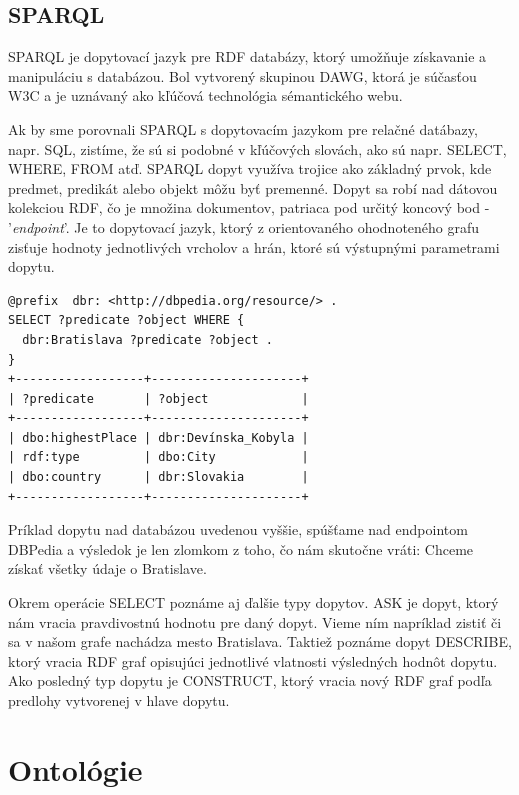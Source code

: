 \documentclass[12pt, a4paper, oneside]{book}
\begin{document}
\section{SPARQL}
SPARQL \cite{sparql} je dopytovací jazyk pre RDF databázy, ktorý umožňuje získavanie a manipuláciu s databázou. Bol vytvorený skupinou DAWG, ktorá je súčasťou W3C a je uznávaný ako kľúčová technológia sémantického webu. 


\quad Ak by sme porovnali SPARQL s dopytovacím jazykom pre relačné datábazy, napr. SQL, zistíme, že sú si podobné v kľúčových slovách, ako sú napr. SELECT, WHERE, FROM atď. SPARQL dopyt využíva trojice ako základný prvok, kde predmet, predikát alebo objekt môžu byť premenné. Dopyt sa robí nad dátovou kolekciou RDF, čo je množina dokumentov, patriaca pod určitý koncový bod - '\textit{endpoint}'. Je to dopytovací jazyk, ktorý z orientovaného ohodnoteného grafu zisťuje hodnoty jednotlivých vrcholov a hrán, ktoré sú výstupnými parametrami dopytu.

\begin{verbatim}
@prefix	 dbr: <http://dbpedia.org/resource/> .
SELECT ?predicate ?object WHERE {
  dbr:Bratislava ?predicate ?object .
}
+------------------+---------------------+
| ?predicate       | ?object             | 
+------------------+---------------------+
| dbo:highestPlace | dbr:Devínska_Kobyla | 
| rdf:type         | dbo:City            | 
| dbo:country      | dbr:Slovakia        | 
+------------------+---------------------+
\end{verbatim}


Príklad dopytu nad databázou uvedenou vyššie, spúšťame nad endpointom DBPedia a výsledok je len zlomkom z toho, čo nám skutočne vráti: Chceme získať všetky údaje o Bratislave.


Okrem operácie SELECT poznáme aj ďalšie typy dopytov. ASK je dopyt, ktorý nám vracia pravdivostnú hodnotu pre daný dopyt. Vieme ním napríklad zistiť či sa v našom grafe nachádza mesto Bratislava. Taktiež poznáme dopyt DESCRIBE, ktorý vracia RDF graf opisujúci jednotlivé vlatnosti výsledných hodnôt dopytu. Ako posledný typ dopytu je CONSTRUCT, ktorý vracia nový RDF graf podľa predlohy vytvorenej v hlave dopytu.

\chapter{Ontológie}

\end{document}
